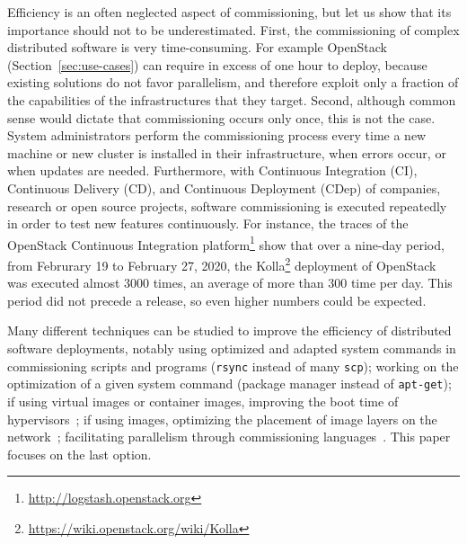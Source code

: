 Efficiency is an often neglected aspect of commissioning, but let us show
that its importance should not to be underestimated. First, the
commissioning of complex distributed software is very
time-consuming. For example OpenStack (Section~\ref{sec:use-cases})
can require in excess of one hour to deploy, because existing
solutions do not favor parallelism, and therefore exploit only a
fraction of the capabilities of the infrastructures that they
target. Second, although common sense would dictate that commissioning
occurs only once, this is not the case. System administrators perform
the commissioning process every time a new machine or new cluster is
installed in their infrastructure, when errors occur, or when updates
are needed.
%
Furthermore, with Continuous Integration (CI), Continuous Delivery
(CD), and Continuous Deployment (CDep) of companies, research or open
source projects, software commissioning is executed repeatedly in
order to test new features continuously. For instance, the traces of
the OpenStack Continuous Integration
platform\footnote{\url{http://logstash.openstack.org}} show that over
a nine-day period, from Februrary 19 to February 27, 2020, the
Kolla\footnote{\url{https://wiki.openstack.org/wiki/Kolla}} deployment
of OpenStack was executed almost 3000 times, an average of more than
300 time per day. This period did not precede a release, so even
higher numbers could be expected.


Many different techniques can be studied to improve the
efficiency of distributed software deployments, notably using
optimized and adapted system commands in commissioning scripts and
programs (\eg \texttt{rsync} instead of many \texttt{scp}); working on
the optimization of a given system command (\eg \nix package manager
instead of \texttt{apt-get}); if using virtual images or container
images, improving the boot time of
hypervisors~\cite{nguyen:hal-02172288}; if using \docker images,
optimizing the placement of image layers on the
network~\cite{darrous:hal-01745405}; facilitating parallelism through
commissioning languages~\cite{dicosmo:hal-01233489}. This paper
focuses on the last option.

